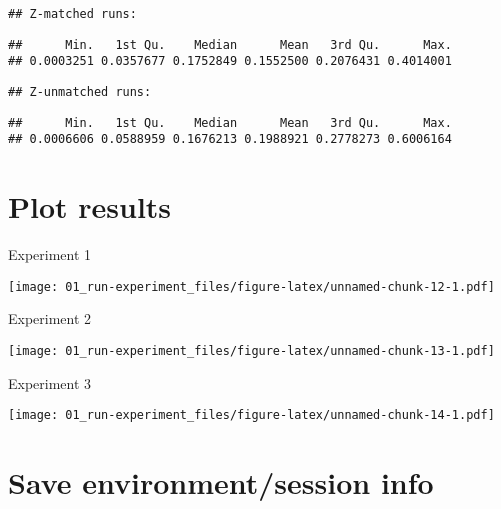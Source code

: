 \documentclass[
]{article}
\begin{document}
\begin{verbatim}
## Z-matched runs:
\end{verbatim}

\begin{verbatim}
##      Min.   1st Qu.    Median      Mean   3rd Qu.      Max. 
## 0.0003251 0.0357677 0.1752849 0.1552500 0.2076431 0.4014001
\end{verbatim}

\begin{verbatim}
## Z-unmatched runs:
\end{verbatim}

\begin{verbatim}
##      Min.   1st Qu.    Median      Mean   3rd Qu.      Max. 
## 0.0006606 0.0588959 0.1676213 0.1988921 0.2778273 0.6006164
\end{verbatim}

\hypertarget{plot-results}{%
\section{Plot results}\label{plot-results}}

Experiment 1

\texttt{[image: 01\_run-experiment\_files/figure-latex/unnamed-chunk-12-1.pdf]}

Experiment 2

\texttt{[image: 01\_run-experiment\_files/figure-latex/unnamed-chunk-13-1.pdf]}

Experiment 3

\texttt{[image: 01\_run-experiment\_files/figure-latex/unnamed-chunk-14-1.pdf]}

\hypertarget{save-environmentsession-info}{%
\section{Save environment/session
info}\label{save-environmentsession-info}}
\end{document}
